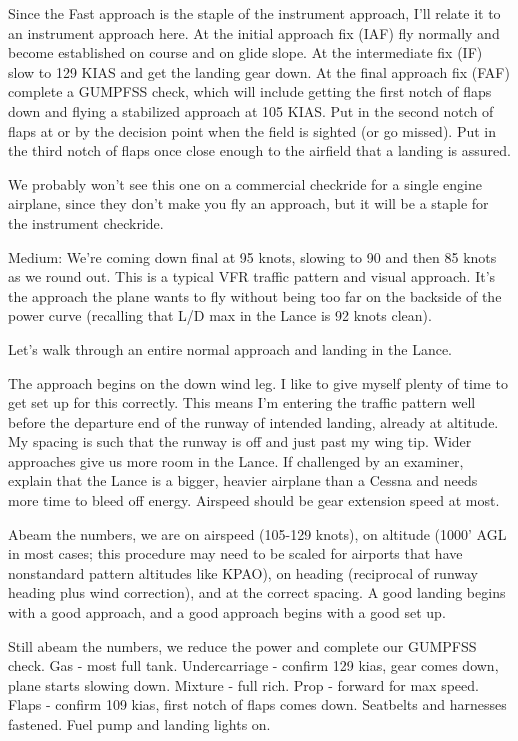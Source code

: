 Since the Fast approach is the staple of the instrument approach, I'll relate it to an instrument approach here. At the initial approach fix (IAF) fly normally and become established on course and on glide slope. At the intermediate fix (IF) slow to 129 KIAS and get the landing gear down. At the final approach fix (FAF) complete a GUMPFSS check, which will include getting the first notch of flaps down and flying a stabilized approach at 105 KIAS. Put in the second notch of flaps at or by the decision point when the field is sighted (or go missed). Put in the third notch of flaps once close enough to the airfield that a landing is assured.

We probably won't see this one on a commercial checkride for a single engine airplane, since they don't make you fly an approach, but it will be a staple for the instrument checkride.

Medium: We're coming down final at 95 knots, slowing to 90 and then 85 knots as we round out. This is a typical VFR traffic pattern and visual approach. It's the approach the plane wants to fly without being too far on the backside of the power curve (recalling that L/D max in the Lance is 92 knots clean).

Let's walk through an entire normal approach and landing in the Lance.

The approach begins on the down wind leg. I like to give myself plenty of time to get set up for this correctly. This means I'm entering the traffic pattern well before the departure end of the runway of intended landing, already at altitude. My spacing is such that the runway is off and just past my wing tip. Wider approaches give us more room in the Lance. If challenged by an examiner, explain that the Lance is a bigger, heavier airplane than a Cessna and needs more time to bleed off energy. Airspeed should be gear extension speed at most.

Abeam the numbers, we are on airspeed (105-129 knots), on altitude (1000' AGL in most cases; this procedure may need to be scaled for airports that have nonstandard pattern altitudes like KPAO), on heading (reciprocal of runway heading plus wind correction), and at the correct spacing. A good landing begins with a good approach, and a good approach begins with a good set up.

Still abeam the numbers, we reduce the power and complete our GUMPFSS check. Gas - most full tank. Undercarriage - confirm 129 kias, gear comes down, plane starts slowing down. Mixture - full rich. Prop - forward for max speed. Flaps - confirm 109 kias, first notch of flaps comes down. Seatbelts and harnesses fastened. Fuel pump and landing lights on.

